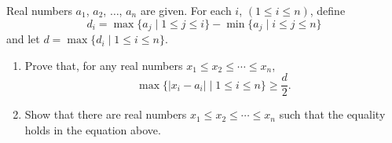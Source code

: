 Real numbers $ a_{1}$,  $ a_{2}$,  $ \ldots$,  $ a_{n}$ are given. For each $ i$,  $ (1 \leq i \leq n )$,  define\[ d_{i} = \max \{ a_{j}\mid 1 \leq j \leq i \} - \min \{ a_{j}\mid i \leq j \leq n \}
\]
and let $ d = \max \{d_{i}\mid 1 \leq i \leq n \}$.

\begin{enumerate}[label = (\alph*)]
	\item Prove that, for any real numbers $ x_{1}\leq x_{2}\leq \cdots \leq x_{n}$, \[ \max \{ |x_{i} - a_{i}| \mid 1 \leq i \leq n \}\geq \frac {d}{2}.
\]
	\item Show that there are real numbers $ x_{1}\leq x_{2}\leq \cdots \leq x_{n}$ such that the equality holds in the equation above.
\end{enumerate}
